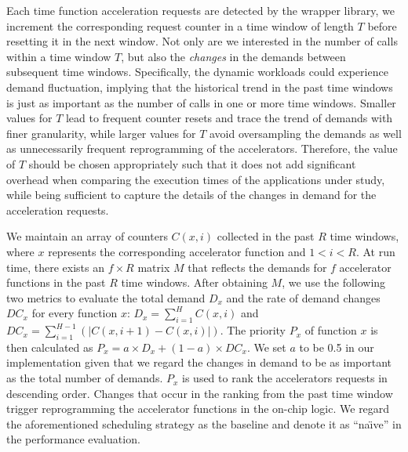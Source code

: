 Each time function acceleration requests are detected by the
wrapper library, we increment the corresponding request counter in a
time window of length $T$ before resetting it in the next window. 
Not only are we interested in the number of calls within a time window $T$, but also the {\em changes} in the demands
between subsequent time windows. Specifically, the dynamic workloads
could experience demand fluctuation, implying that the historical trend in the
past time windows is just as important as the number of calls in one or
more time windows.
Smaller values for $T$ lead to frequent counter resets and trace the trend
of demands with finer granularity, while larger values for $T$ avoid
oversampling the demands as well as unnecessarily frequent reprogramming of the accelerators. Therefore, the value of $T$ should be chosen
appropriately such that it does not add significant overhead when
comparing the execution times of the applications under study, while being sufficient
to capture the details of the changes in demand for the acceleration requests. 

We maintain an array of counters $C(x, i)$ collected in the past $R$
time windows, where $x$ represents the corresponding accelerator
function and $1<i<R$. At run time, there exists an $f \times R$
matrix $M$ that reflects the demands for $f$ accelerator functions in
the past $R$ time windows.  After obtaining $M$, we use the following
two metrics to evaluate the total demand $D_x$ and the rate of demand
changes $DC_x$ for every function $x$: $D_{x} = \sum_{i=1}^{H}C(x,i)$
and $DC_{x} = \sum_{i=1}^{H-1}(|C(x, i+1)-C(x, i)|)$.  The priority
$P_x$ of function $x$ is then calculated as $P_x = a \times D_x +
(1-a) \times DC_x$. We set $a$ to be 0.5 in our implementation given that we
regard the changes in demand to be as important as the total number of demands. $P_x$
is used to rank the accelerators requests in descending
order. Changes that occur in the ranking from the past time window trigger
reprogramming the accelerator functions in the on-chip logic. We regard the aforementioned scheduling strategy as the baseline and denote it as ``na\"{\i}ve'' in the performance evaluation.




